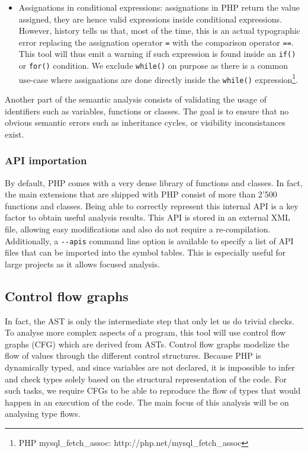 \documentclass[a4paper]{article}
\begin{document}
\begin{itemize}
    variable, or an expression\footnote{PHP Variable variables:
    http://php.net/variables.variable}: (\verb=$$var= or
    \verb=${'prefix'.$name.foo()}=).
  \item Assignations in conditional expressions: assignations in PHP return the
    value assigned, they are hence valid expressions inside conditional
    expressions. However, history tells us that, most of the time, this is an
    actual typographic error replacing the assignation operator \verb&=& with
    the comparison operator \verb&==&. This tool will thus emit a warning if
    such expression is found inside an \verb&if()& or \verb&for()& condition.
    We exclude \verb&while()& on purpose as there is a common use-case where
    assignations are done directly inside the \verb&while()&
    expression\footnote{PHP mysql\_fetch\_assoc:
    http://php.net/mysql\_fetch\_assoc}.
\end{itemize}

Another part of the semantic analysis consists of validating the usage of
identifiers such as variables, functions or classes. The goal is to ensure that
no obvious semantic errors such as inheritance cycles, or visibility
inconsistances exist.

\subsubsection{API importation}
By default, PHP comes with a very dense library of functions and classes. In
fact, the main extensions that are shipped with PHP consist of more than 2'500
functions and classes. Being able to correctly represent this internal API is
a key factor to obtain useful analysis results. This API is stored in an external
XML file, allowing easy modifications and also do not require a re-compilation.
Additionally, a \verb=--apis= command line option is available to specify a
list of API files that can be imported into the symbol tables. This is especially
useful for large projects as it allows focused analysis.



\subsection{Control flow graphs}
In fact, the AST is only the intermediate step that only let us do trivial
checks. To analyse more complex aspects of a program, this tool will use
control flow graphs (CFG) which are derived from ASTs.  Control flow graphs
modelize the flow of values through the different control structures. Because
PHP is dynamically typed, and since variables are not declared, it is
impossible to infer and check types solely based on the structural
representation of the code. For such tasks, we require CFGs to be able to
reproduce the flow of types that would happen in an execution of the code. The
main focus of this analysis will be on analysing type flows.
\end{document}
